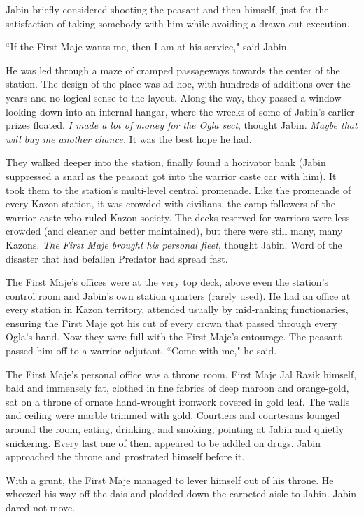 \documentclass[twoside,letterpaper,12pt]{memoir}
\begin{document}
Jabin briefly considered shooting the peasant and then himself, just for the satisfaction of taking somebody with him while avoiding a drawn-out execution.

``If the First Maje wants me, then I am at his service," said Jabin.

He was led through a maze of cramped passageways towards the center of the station. The design of the place was ad hoc, with hundreds of additions over the years and no logical sense to the layout. Along the way, they passed a window looking down into an internal hangar, where the wrecks of some of Jabin's earlier prizes floated. \textit{I made a lot of money for the Ogla sect}, thought Jabin. \textit{Maybe that will buy me another chance.} It was the best hope he had.

They walked deeper into the station, finally found a horivator bank (Jabin suppressed a snarl as the peasant got into the warrior caste car with him). It took them to the station's multi-level central promenade. Like the promenade of every Kazon station, it was crowded with civilians, the camp followers of the warrior caste who ruled Kazon society. The decks reserved for warriors were less crowded (and cleaner and better maintained), but there were still many, many Kazons. \textit{The First Maje brought his personal fleet}, thought Jabin. Word of the disaster that had befallen Predator had spread fast.

The First Maje's offices were at the very top deck, above even the station's control room and Jabin's own station quarters (rarely used). He had an office at every station in Kazon territory, attended usually by mid-ranking functionaries, ensuring the First Maje got his cut of every crown that passed through every Ogla's hand. Now they were full with the First Maje's entourage. The peasant passed him off to a warrior-adjutant. ``Come with me," he said.

The First Maje's personal office was a throne room. First Maje Jal Razik himself, bald and immensely fat, clothed in fine fabrics of deep maroon and orange-gold, sat on a throne of ornate hand-wrought ironwork covered in gold leaf. The walls and ceiling were marble trimmed with gold. Courtiers and courtesans lounged around the room, eating, drinking, and smoking, pointing at Jabin and quietly snickering. Every last one of them appeared to be addled on drugs. Jabin approached the throne and prostrated himself before it.

With a grunt, the First Maje managed to lever himself out of his throne. He wheezed his way off the dais and plodded down the carpeted aisle to Jabin. Jabin dared not move.
\end{document}
